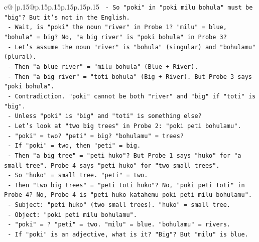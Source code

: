 \documentclass{article}
\begin{document}
{\begin{supertabular}{c@{$\;$}|p{.15\linewidth}@{}p{.15\linewidth}p{.15\linewidth}p{.15\linewidth}p{.15\linewidth}p{.15\linewidth}}
{{{\texttt{                            {-} So "poki" in "poki milu bohula" must be "big"? But it's not in the English.} \\
\texttt{                            {-} Wait, is "poki" the noun "river" in Probe 1? "milu" = blue, "bohula" = big? No, "a big river" is "poki bohula" in Probe 3?} \\
\texttt{                            {-} Let's assume the noun "river" is "bohula" (singular) and "bohulamu" (plural).} \\
\texttt{                            {-} Then "a blue river" = "milu bohula" (Blue + River).} \\
\texttt{                            {-} Then "a big river" = "toti bohula" (Big + River). But Probe 3 says "poki bohula".} \\
\texttt{                            {-} Contradiction. "poki" cannot be both "river" and "big" if "toti" is "big".} \\
\texttt{                            {-} Unless "poki" is "big" and "toti" is something else?} \\
\texttt{                            {-} Let's look at "two big trees" in Probe 2: "poki peti bohulamu".} \\
\texttt{                              {-} "poki" = two? "peti" = big? "bohulamu" = trees?} \\
\texttt{                              {-} If "poki" = two, then "peti" = big.} \\
\texttt{                              {-} Then "a big tree" = "peti huko"? But Probe 1 says "huko" for "a small tree". Probe 4 says "peti huko" for "two small trees".} \\
\texttt{                              {-} So "huko" = small tree. "peti" = two.} \\
\texttt{                              {-} Then "two big trees" = "peti toti huko"? No, "poki peti toti" in Probe 4? No, Probe 4 is "peti huko katahemu poki peti milu bohulamu".} \\
\texttt{                              {-} Subject: "peti huko" (two small trees). "huko" = small tree.} \\
\texttt{                              {-} Object: "poki peti milu bohulamu".} \\
\texttt{                                {-} "poki" = ? "peti" = two. "milu" = blue. "bohulamu" = rivers.} \\
\texttt{                                {-} If "poki" is an adjective, what is it? "Big"? But "milu" is blue.} \\
}}}
\end{supertabular}}
\end{document}
